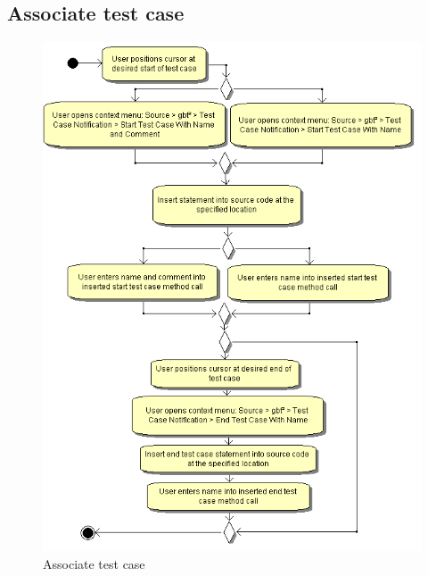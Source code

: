 \clearpage
\subsection{Associate test case}
\begin{figure}[htb]
 \centering
 \includegraphics[height=0.7\textheight]{images/Activities/associate_test_case.png}
 \caption{Associate test case}
 \label{ac_fg:associate}
\end{figure}

\clearpage
